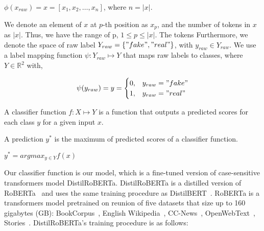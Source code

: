\begin{center}
    $\phi(x_{raw}) = x = [x_1, x_2, \dots, x_n]$, where $n = |x|$.
\end{center}
We denote an element of $x$ at $p$-th position as $x_p$, and the number of tokens in $x$ as $|x|$. Thus, we have the range of p, $1 \leq p \leq |x|$. The tokens
Furthermore, we denote the space of raw label $Y_{raw} = \{"fake", "real"\}$, with
$y_{raw} \in Y_{raw}$. We use a label mapping function $\psi: Y_{raw} \mapsto Y$ that maps raw labels to classes, where $Y \in \mathbb{R}^2$ with,
\begin{center}
    \[\psi(y_{raw}) = y =
        \begin{cases}
            0, & y_{raw} = "fake" \\
            1, & y_{raw} = "real"
        \end{cases}
    \]
\end{center}
\begin{definition}
    A classifier function $f:X \mapsto Y$ is a function that outputs a predicted scores for each class $y$ for a given input $x$.
\end{definition}
\begin{definition}
    A prediction $y^*$ is the maximum of predicted scores of a classifier function.
    \begin{center}
        $y^* = argmax_{y \in Y} f(x)$
    \end{center}
\end{definition}
Our classifier function is our model, which is a fine-tuned version of case-sensitive transformers model DistilRoBERTa. DistilRoBERTa is a distilled version of RoBERTa~\parencite{RoBERTa_Liu} and uses the same training procedure as DistilBERT~\parencite{DistilBERT_Sanh}. RoBERTa is a transformers model pretrained on reunion of five datasets that size up to 160 gigabytes (GB): BookCorpus~\parencite{BookCorpus_Yukun}, English Wikipedia~\parencite{EnglishWikipedia_Wiki}, CC-News~\parencite{CCNews_Nagel}, OpenWebText~\parencite{OpenWebText_Radford}, Stories~\parencite{ASimpleMethodForCommonsenseReasoning_Trinh}. DistilRoBERTa's training procedure is as follows:\\
